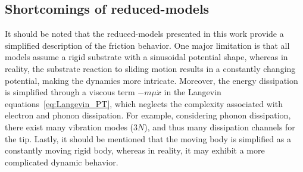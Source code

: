 \subsection{Shortcomings of reduced-models}
It should be noted that the reduced-models presented in this work provide a simplified description of the friction behavior. One major limitation is that all models assume a rigid substrate with a sinusoidal potential shape, whereas in reality, the substrate reaction to sliding motion results in a constantly changing potential, making the dynamics more intricate. Moreover, the energy dissipation is simplified through a viscous term $-m\mu \dot{x}$ in the Langevin equations~\cref{eq:Langevin_PT}, which neglects the complexity associated with electron and phonon dissipation. For example, considering phonon dissipation, there exist many vibration modes ($3N$), and thus many dissipation channels for the tip. Lastly, it should be mentioned that the moving body is simplified as a constantly moving rigid body, whereas in reality, it may exhibit a more complicated dynamic behavior.







